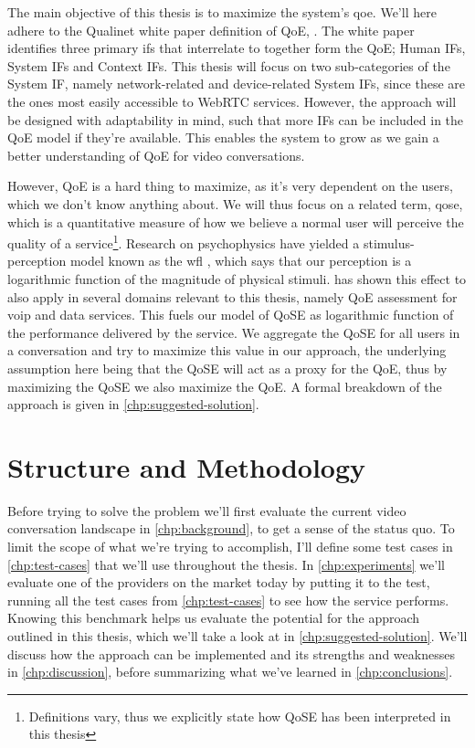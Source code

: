 The main objective of this thesis is to maximize the system's \gls{qoe}. We'll here adhere to the Qualinet white paper definition of QoE,  \cite{qualinet}. The white paper identifies three primary \glspl{if} that interrelate to together form the QoE; Human IFs, System IFs and Context IFs. This thesis will focus on two sub-categories of the System IF, namely network-related and device-related System IFs, since these are the ones most easily accessible to WebRTC services. However, the approach will be designed with adaptability in mind, such that more IFs can be included in the QoE model if they're available. This enables the system to grow as we gain a better understanding of QoE for video conversations.

However, QoE is a hard thing to maximize, as it's very dependent on the users, which we don't know anything about. We will thus focus on a related term, \gls{qose}, which is a quantitative measure of how we believe a normal user will perceive the quality of a service\footnote{Definitions vary, thus we explicitly state how QoSE has been interpreted in this thesis}. Research on psychophysics have yielded a stimulus-perception model known as the \gls{wfl} \cite{wfl}, which says that our perception is a logarithmic function of the magnitude of physical stimuli. \cite{wfl-qoe} has shown this effect to also apply in several domains relevant to this thesis, namely QoE assessment for \gls{voip} and data services. This fuels our model of QoSE as logarithmic function of the performance delivered by the service. We aggregate the QoSE for all users in a conversation and try to maximize this value in our approach, the underlying assumption here being that the QoSE will act as a proxy for the QoE, thus by maximizing the QoSE we also maximize the QoE. A formal breakdown of the approach is given in \autoref{chp:suggested-solution}.


\section{Structure and Methodology}

Before trying to solve the problem we'll first evaluate the current video conversation landscape in \autoref{chp:background}, to get a sense of the status quo. To limit the scope of what we're trying to accomplish, I'll define some test cases in \autoref{chp:test-cases} that we'll use throughout the thesis. In \autoref{chp:experiments} we'll evaluate one of the providers on the market today by putting it to the test, running all the test cases from \autoref{chp:test-cases} to see how the service performs. Knowing this benchmark helps us evaluate the potential for the approach outlined in this thesis, which we'll take a look at in \autoref{chp:suggested-solution}. We'll discuss how the approach can be implemented and its strengths and weaknesses in \autoref{chp:discussion}, before summarizing what we've learned in \autoref{chp:conclusions}.


